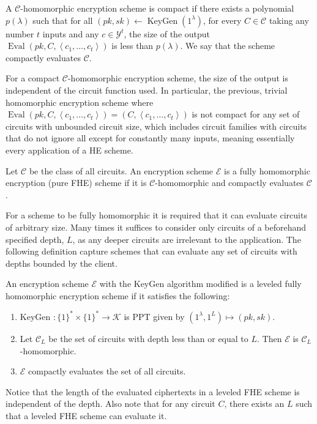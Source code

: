 \begin{definition}[Compactness]
A $\mathcal{C}$-homomorphic encryption scheme is compact if there exists a polynomial $p(\lambda)$ such that for all $(pk,sk) \leftarrow \operatorname{KeyGen}(1^{\lambda})$, for every $C \in \mathcal{C}$ taking any number $t$ inputs and any $c \in \mathcal{Y}^t$, the size of the output $\operatorname{Eval}(pk, C, \left\langle c_1, \dots, c_t \right\rangle)$ is less than $p(\lambda)$. We say that the scheme compactly evaluates $\mathcal{C}$.
\end{definition}

For a compact $\mathcal{C}$-homomorphic encryption scheme, the size of the output is independent of the circuit function used. In particular, the previous, trivial homomorphic encryption scheme where $\operatorname{Eval}(pk, C,\left\langle c_1, \dots ,c_t \right\rangle) = (C, \left\langle c_1, \dots, c_t \right \rangle)$ is not compact for any set of circuits with unbounded circuit size, which includes circuit families with circuits that do not ignore all except for constantly many inputs, meaning essentially every application of a HE scheme.

\begin{definition}
Let $\mathcal{C}$ be the class of all circuits. An encryption scheme $\mathcal{E}$ is a fully homomorphic encryption (pure FHE) scheme if it is $\mathcal{C}$-homomorphic and compactly evaluates $\mathcal{C}$.
\end{definition}

For a scheme to be fully homomorphic it is required that it can evaluate circuits of arbitrary size. Many times it suffices to consider only circuits of a beforehand specified depth, $L$, as any deeper circuits are irrelevant to the application. The following definition capture schemes that can evaluate any set of circuits with depths bounded by the client.   

\begin{definition}
An encryption scheme $\mathcal{E}$ with the KeyGen algorithm modified is a leveled fully homomorphic encryption scheme if it satisfies the following:
\begin{enumerate}[label={$\bullet$}]
    \item KeyGen $\colon \{1\}^* \times \{1\}^* \to \mathcal{K}$ is PPT given by $(1^{\lambda},1^L) \mapsto (pk,sk)$.
    \item Let $\mathcal{C}_L$ be the set of circuits with depth less than or equal to $L$. Then $\mathcal{E}$ is $\mathcal{C}_L$-homomorphic.
    \item $\mathcal{E}$ compactly evaluates the set of all circuits. 
\end{enumerate}
\end{definition}
\begin{remark}
    Notice that the length of the evaluated ciphertexts in a leveled FHE scheme is independent of the depth.
    Also note that for any circuit $C$, there exists an $L$ such that a leveled FHE scheme can evaluate it.
\end{remark}

